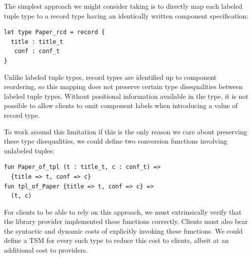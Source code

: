 The simplest approach we might consider taking is to directly map each labeled tuple type to a record type having an identically written component specification:
\begin{lstlisting}[numbers=none]
let type Paper_rcd = record {
  title : title_t
   conf : conf_t 
}\end{lstlisting}
Unlike labeled tuple types, record types are identified up to component reordering, so this mapping does not preserve certain type disequalities between labeled tuple types. Without positional information available in the type, it is not  possible to allow clients to omit component labels when introducing a value of record type.%

To work around this limitation if this is the only reason we care about preserving these type disequalities, we could define two conversion functions involving unlabeled tuples:
\begin{lstlisting}[numbers=none]
fun Paper_of_tpl (t : title_t, c : conf_t) => 
  {title => t, conf => c}
fun tpl_of_Paper {title => t, conf => c} =>
  (t, c)
\end{lstlisting}
For clients to be able to rely on this approach, we must extrinsically verify that the library provider implemented these functions correctly. Clients must also bear the syntactic and dynamic costs of explicitly invoking these functions. We could define a TSM for every such type to reduce this cost to clients, albeit at an additional cost to providers.  %

